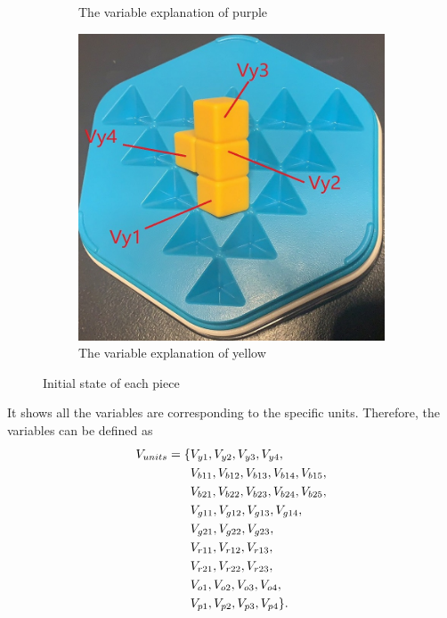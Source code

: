 \begin{figure}[htbp]
\begin{subfigure}[b]{0.25\textwidth}
\caption{The variable explanation of purple}
  \label{fig:3Dpurple}
\end{subfigure}
\begin{subfigure}[b]{0.25\textwidth}
\centering
\includegraphics[width=\textwidth]{figs/3Dyellow.jpg}
\caption{The variable explanation of yellow}
  \label{fig:3Dyellow}
\end{subfigure}
\caption{Initial state of each piece}
  \label{fig:all3Dinit}
\end{figure}
It shows all the variables are corresponding to the specific units. Therefore, the variables can be defined as
\begin{equation}
\begin{aligned}
V_{units}=\{&V_{y1},V_{y2},V_{y3},V_{y4},\\&V_{b11},V_{b12},V_{b13},V_{b14},
V_{b15},\\&V_{b21},V_{b22},V_{b23},V_{b24},V_{b25},\\&V_{g11},V_{g12},V_{g13},V_{g14},\\&V_{g21},V_{g22},V_{g23},\\&V_{r11},
V_{r12},V_{r13},\\&V_{r21},V_{r22},V_{r23},\\&V_{o1},V_{o2},V_{o3},V_{o4},\\&V_{p1},V_{p2},V_{p3},V_{p4}\}.
\end{aligned}
\end{equation}
